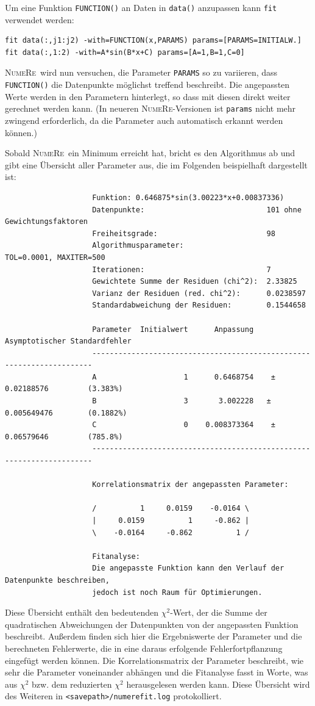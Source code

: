 \documentclass[DIV=14,headsepline,footsepline]{scrbook}
\newcommand{\NR}{\textsc{Nu\-me\-Re}}
\begin{document}
				Um eine Funktion \verb+FUNCTION()+ an Daten in \verb+data()+ anzupassen kann \verb+fit+ verwendet werden:
				\begin{lstlisting}
fit data(:,j1:j2) -with=FUNCTION(x,PARAMS) params=[PARAMS=INITIALW.]
fit data(:,1:2) -with=A*sin(B*x+C) params=[A=1,B=1,C=0]
				\end{lstlisting}
				\NR\ wird nun versuchen, die Parameter \verb+PARAMS+ so zu variieren, dass \verb+FUNCTION()+ die Datenpunkte möglichst treffend beschreibt. Die angepassten Werte werden in den Parametern hinterlegt, so dass mit diesen direkt weiter gerechnet werden kann. (In neueren \NR-Versionen ist \verb+params+ nicht mehr zwingend erforderlich, da die Parameter auch automatisch erkannt werden können.)
				
				Sobald \NR\ ein Minimum erreicht hat, bricht es den Algorithmus ab und gibt eine Übersicht aller Parameter aus, die im Folgenden beispielhaft dargestellt ist:
				\begin{verbatim}
					Funktion: 0.646875*sin(3.00223*x+0.00837336)
					Datenpunkte:                            101 ohne Gewichtungsfaktoren
					Freiheitsgrade:                         98
					Algorithmusparameter:                   TOL=0.0001, MAXITER=500
					Iterationen:                            7
					Gewichtete Summe der Residuen (chi^2):  2.33825
					Varianz der Residuen (red. chi^2):      0.0238597
					Standardabweichung der Residuen:        0.1544658

					Parameter  Initialwert      Anpassung    Asymptotischer Standardfehler
					----------------------------------------------------------------------
					A                    1      0.6468754    ± 0.02188576         (3.383%)
					B                    3       3.002228   ± 0.005649476        (0.1882%)
					C                    0    0.008373364    ± 0.06579646         (785.8%)
					----------------------------------------------------------------------

					Korrelationsmatrix der angepassten Parameter:

					/          1     0.0159    -0.0164 \
					|     0.0159          1     -0.862 |
					\    -0.0164     -0.862          1 /

					Fitanalyse:
					Die angepasste Funktion kann den Verlauf der Datenpunkte beschreiben,
					jedoch ist noch Raum für Optimierungen.
				\end{verbatim}
				Diese Übersicht enthält den bedeutenden $\chi^2$-Wert, der die Summe der quadratischen Abweichungen der Datenpunkten von der angepassten Funktion beschreibt. Außerdem finden sich hier die Ergebniswerte der Parameter und die berechneten Fehlerwerte, die in eine daraus erfolgende Fehlerfortpflanzung eingefügt werden können. Die Korrelationsmatrix der Parameter beschreibt, wie sehr die Parameter voneinander abhängen und die Fitanalyse fasst in Worte, was aus $\chi^2$ bzw. dem reduzierten $\chi^2$ herausgelesen werden kann. Diese Übersicht wird des Weiteren in \verb+<savepath>/numerefit.log+ protokolliert.
\end{document}
